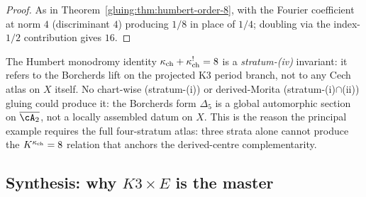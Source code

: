 \begin{proof}
As in Theorem~\ref{gluing:thm:humbert-order-8}, with the Fourier
coefficient at norm $4$ (discriminant $4$) producing $1/8$ in place
of $1/4$; doubling via the index-$1/2$ contribution gives $16$.
\end{proof}

\begin{remark}
\label{gluing:rem:iv-invisible-cech}
The Humbert monodromy identity $\kappa_{\mathrm{ch}} + \kappa_{\mathrm{ch}}^! = 8$ is a
\emph{stratum-(iv)} invariant: it refers to the Borcherds lift on
the projected K3 period branch, not to any Cech atlas on $X$ itself.
No chart-wise (stratum-(i)) or derived-Morita (stratum-(i)$\cap$(ii))
gluing could produce it: the Borcherds form $\Delta_5$ is a global
automorphic section on $\overline{\cA_2}$, not a locally assembled
datum on $X$. This is the reason the principal example requires the
full four-stratum atlas: three strata alone cannot produce the
$K^{\kappa_{\mathrm{ch}}} = 8$ relation that anchors the derived-centre
complementarity.
\end{remark}

\subsection{Synthesis: why $K3 \times E$ is the master}
\label{gluing:sec:k3xe-synthesis}

